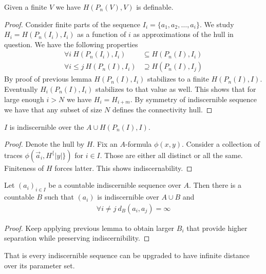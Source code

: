 \documentclass{amsart}
\begin{document}
\begin{Note}
	Given a finite $V$ we have $H(P_n(V), V)$ is definable.
\end{Note}

\begin{proof}
	Consider finite parts of the sequence $I_i = \{a_1, a_2, \ldots, a_i\}$. We study $H_i = H(P_n(I_i), I_i)$ as a function of $i$ as approximations of the hull in question. We have the following properties
	\begin{align*}
		 \forall i \ H(P_n(I_i), I_i) &\subseteq H(P_n(I), I_i) \\
		 \forall i \leq j \ H(P_n(I), I_i) &\supseteq H(P_n(I), I_j)
	\end{align*}
	By proof of previous lemma $H(P_n(I), I_i)$ stabilizes to a finite $H(P_n(I), I)$. Eventually $H_i(P_n(I), I_i)$ stabilizes to that value as well. This shows that for large enough $i>N$ we have $H_i = H_{i+m}$. By symmetry of indiscernible sequence we have that any subset of size $N$ defines the connectivity hull.
\end{proof}

\begin{Lemma}
	$I$ is indiscernible over the $A \cup H(P_n(I), I)$.
\end{Lemma}

\begin{proof}
	Denote the hull by $H$. Fix an $A$-formula $\phi(x,y)$. Consider a collection of traces $\phi(\vec a_i, H^\{|y|\})$ for $i \in I$. Those are either all distinct or all the same. Finiteness of $H$ forces latter. This shows indiscernability.
\end{proof}

\begin{Corollary}
	Let $(a_i)_{i \in I}$ be a countable indiscernible sequence over $A$. Then there is a countable $B$ such that  $(a_i)$ is indiscernible over $A \cup B$ and
	\begin{align*}
		\forall i \neq j \ d_B(a_i, a_j) = \infty
	\end{align*}
\end{Corollary}

\begin{proof}
	Keep applying previous lemma to obtain larger $B_i$ that provide higher separation while preserving indiscernibility.
\end{proof}

That is every indiscernible sequence can be upgraded to have infinite distance over its parameter set.
\end{document}
